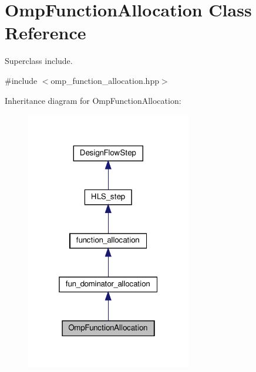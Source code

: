 \hypertarget{classOmpFunctionAllocation}{}\section{Omp\+Function\+Allocation Class Reference}
\label{classOmpFunctionAllocation}


Superclass include.  




{\ttfamily \#include $<$omp\+\_\+function\+\_\+allocation.\+hpp$>$}



Inheritance diagram for Omp\+Function\+Allocation\+:
\nopagebreak
\begin{figure}[H]
\begin{center}
\leavevmode
\includegraphics[width=205pt]{d5/df9/classOmpFunctionAllocation__inherit__graph}
\end{center}
\end{figure}


